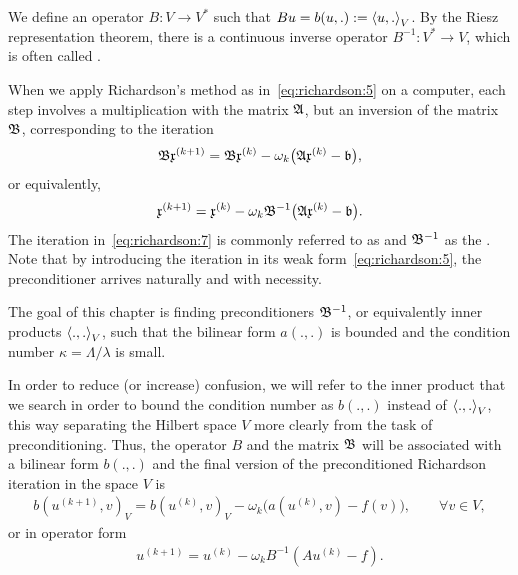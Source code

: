 \begin{note}
  We define an operator $B:V\to V^*$ such that $Bu = b(u,.) :=
  \scal(u,.)_V$. By the Riesz representation theorem, there is a
  continuous inverse operator $B^{-1}: V^*\to V$, which is often
  called .
\end{note}

\begin{definition}
  \label{definition:richardson:2}
  When we apply Richardson's method as in~\eqref{eq:richardson:5} on a
  computer, each step involves a multiplication with the matrix $\mathfrak{A}$,
  but an inversion of the matrix $\mathfrak{B}$, corresponding to the iteration
  \begin{gather*}
    \mathfrak{B} \mathfrak{x}^{(k+1)}
    = \mathfrak{B} \mathfrak{x}^{(k)}
    - \omega_k \bigl(\mathfrak{A} \mathfrak{x}^{(k)} - \mathfrak{b} \bigr),
  \end{gather*}
  or equivalently,
  \begin{gather}
    \label{eq:richardson:7}
    \mathfrak{x}^{(k+1)}
    = \mathfrak{x}^{(k)}
    - \omega_k \mathfrak{B}^{-1}\bigl(\mathfrak{A} \mathfrak{x}^{(k)} - \mathfrak{b} \bigr).
  \end{gather}
  The iteration in~\eqref{eq:richardson:7} is commonly referred to as
   and $\mathfrak{B}^{-1}$ as the
  . Note that by introducing the iteration in
  its weak form~\eqref{eq:richardson:5}, the preconditioner arrives
  naturally and with necessity.
  
  The goal of this chapter is finding preconditioners $\mathfrak{B}^{-1}$, or
  equivalently inner products $\scal(.,.)_V$, such that the bilinear
  form $a(.,.)$ is bounded and the condition number
  $\kappa = \Lambda/\lambda$ is small.
  
  In order to reduce (or increase) confusion, we will refer to the
  inner product that we search in order to bound the condition number
  as $b(.,.)$ instead of $\scal(.,.)_V$, this way separating the
  Hilbert space $V$ more clearly from the task of
  preconditioning. Thus, the operator $B$ and the matrix $\mathfrak{B}$ will
  be associated with a bilinear form $b(.,.)$ and the final version of
  the preconditioned Richardson iteration in the space $V$ is
  \begin{gather}
    \label{eq:richardson:10}
    b(u^{(k+1)},v)_V = b(u^{(k)},v)_V
    - \omega_k \bigl(a(u^{(k)},v) - f(v)\bigr), \qquad \forall v\in V,
  \end{gather}
  or in operator form
  \begin{gather}
    \label{eq:richardson:11}
    u^{(k+1)} = u^{(k)} - \omega_k B^{-1} (A u^{(k)} - f).
  \end{gather}
\end{definition}

